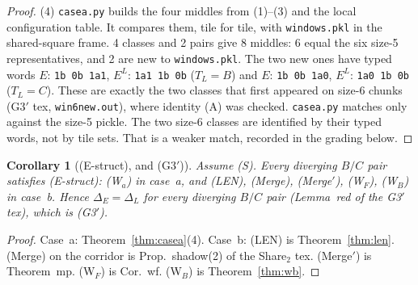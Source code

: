 \documentclass[11pt]{article}
\newtheorem{corollary}[theorem]{Corollary}
\theoremstyle{remark}\newtheorem{remark}[theorem]{Remark}
\begin{document}
\begin{proof}
(4) \texttt{casea.py} builds the four middles from (1)--(3) and the local configuration table. It compares them, tile for tile, with \texttt{windows.pkl} in the shared-square frame. 4 classes and 2 pairs give 8 middles: 6 equal the six size-5 representatives, and 2 are new to \texttt{windows.pkl}. The two new ones have typed words $E$: \texttt{1b 0b 1a1}, $E^L$: \texttt{1a1 1b 0b} ($T_L=B$) and $E$: \texttt{1b 0b 1a0}, $E^L$: \texttt{1a0 1b 0b} ($T_L=C$). These are exactly the two classes that first appeared on size-6 chunks (G3$'$ tex, \texttt{win6new.out}), where identity (A) was checked. \texttt{casea.py} matches only against the size-5 pickle. The two size-6 classes are identified by their typed words, not by tile sets. That is a weaker match, recorded in the grading below.
\end{proof}

\begin{corollary}[(E-struct), and (G3$'$)]\label{cor:g3}
Assume (S). Every diverging $B/C$ pair satisfies (E-struct): (W$_a$) in case~a, and (LEN), (Merge), (Merge$'$), (W$_F$), (W$_B$) in case~b. Hence $\Delta_E=\Delta_L$ for every diverging $B/C$ pair (Lemma~red of the G3$'$ tex), which is (G3$'$).
\end{corollary}
\begin{proof}
Case~a: Theorem~\ref{thm:casea}(4). Case~b: (LEN) is Theorem~\ref{thm:len}. (Merge) on the corridor is Prop.~shadow(2) of the Share$_2$ tex. (Merge$'$) is Theorem~mp. (W$_F$) is Cor.~wf. (W$_B$) is Theorem~\ref{thm:wb}.
\end{proof}
\end{document}
